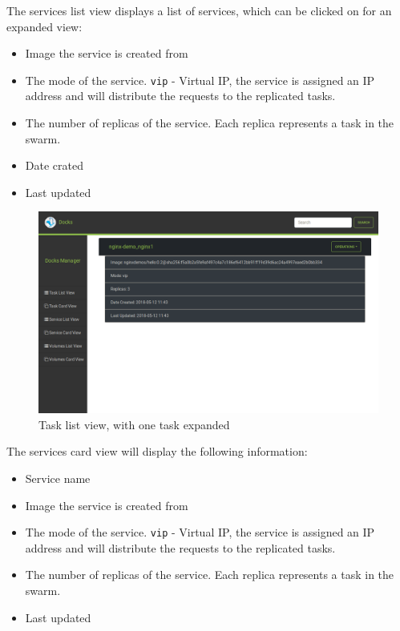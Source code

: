 \documentclass[]{article}
\providecommand{\tightlist}{%
	\setlength{\itemsep}{0pt}\setlength{\parskip}{0pt}}
\let\oldtexttt\texttt
\renewcommand{\texttt}[1]{
	\colorbox{Light}{\oldtexttt{#1}}
}
\begin{document}
The services list view displays a list of services, which can be clicked on for an expanded view:
\begin{itemize}
	\tightlist
	\item Image the service is created from
	\item The mode of the service. \texttt{vip} - Virtual IP, the service is assigned an IP address and will distribute the requests to the replicated tasks.
	\item The number of replicas of the service. Each replica represents a task in the swarm.
	\item Date crated
	\item Last updated
\end{itemize}

\begin{figure}[H]
	\centering
	\includegraphics[scale=0.4]{service_list.png}
	\caption{Task list view, with one task expanded}
\end{figure}

The services card view will display the following information:
\begin{itemize}
	\tightlist
	\item Service name
	\item Image the service is created from
	\item The mode of the service. \texttt{vip} - Virtual IP, the service is assigned an IP address and will distribute the requests to the replicated tasks.
	\item The number of replicas of the service. Each replica represents a task in the swarm.
	\item Last updated
\end{itemize}
\end{document}
